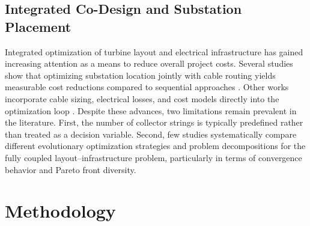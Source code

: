\documentclass[format=sigconf,anonymous=true,review=true]{acmart}
\begin{document}
\subsection{Integrated Co-Design and Substation Placement}
Integrated optimization of turbine layout and electrical infrastructure has gained increasing attention as a means to reduce overall project costs. Several studies show that optimizing substation location jointly with cable routing yields measurable cost reductions compared to sequential approaches \cite{Moon2015Optimal, Jin2019PowerLoss, Jin2025Integrated}. Other works incorporate cable sizing, electrical losses, and cost models directly into the optimization loop \cite{Wang2019Integrated, Nakhai2023Electrical}. Despite these advances, two limitations remain prevalent in the literature. First, the number of collector strings is typically predefined rather than treated as a decision variable. Second, few studies systematically compare different evolutionary optimization strategies and problem decompositions for the fully coupled layout–infrastructure problem, particularly in terms of convergence behavior and Pareto front diversity.

\section{Methodology}
\label{sec:methodology}
\end{document}
